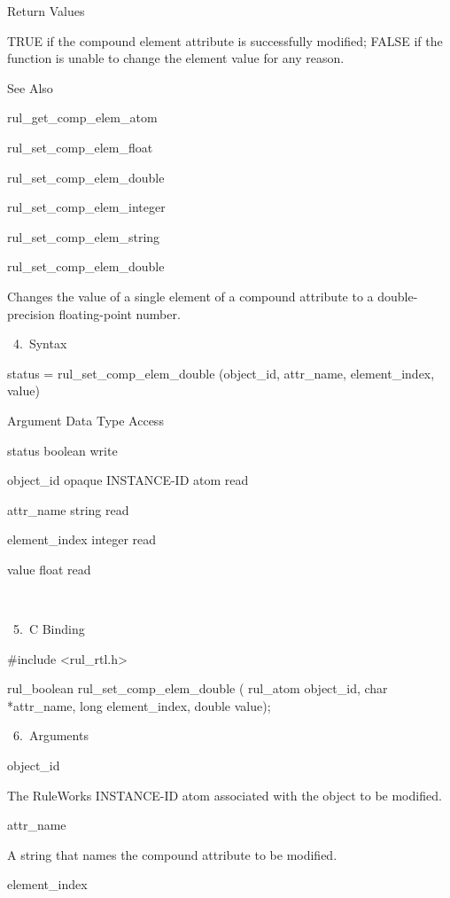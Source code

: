 {          Return Values

          TRUE if the compound element
          attribute is successfully modified;
          FALSE if the function is unable to
          change the element value for any
          reason.

          See Also

          rul_get_comp_elem_atom

          rul_set_comp_elem_float

          rul_set_comp_elem_double

          rul_set_comp_elem_integer

          rul_set_comp_elem_string

          rul_set_comp_elem_double

          Changes the value of a single
          element of a compound attribute to a
          double-precision floating-point
          number.

       4. Syntax

          status = rul_set_comp_elem_double
          (object_id, attr_name,
          element_index, value)

          Argument  Data Type     Access

          status  boolean     write

          object_id  opaque INSTANCE-ID atom
           read

          attr_name  string     read

          element_index  integer     read

          value  float     read

           

       5. C Binding

          #include <rul_rtl.h>

          rul_boolean rul_set_comp_elem_double
          (
          rul_atom object_id,
          char *attr_name,
          long element_index,
          double value);

       6. Arguments

          object_id

          The RuleWorks INSTANCE-ID atom
          associated with the object to be
          modified.

          attr_name

          A string that names the compound
          attribute to be modified.

          element_index

}
